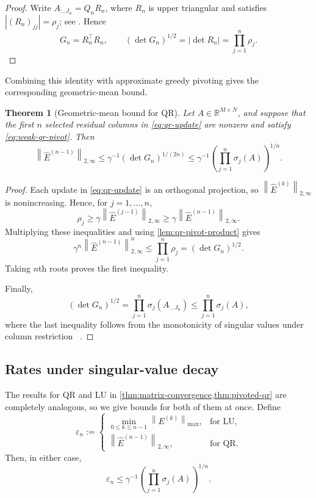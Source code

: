 \documentclass[11pt]{article}
\newtheorem{theorem}{Theorem}[section]
\theoremstyle{definition}
\theoremstyle{remark}
\newcommand{\R}{\mathbb{R}}
\newcommand{\norm}[1]{\left\lVert #1\right\rVert}
\newcommand{\abs}[1]{\left\lvert #1\right\rvert}
\begin{document}
\begin{proof}
Write
$
    A_{:,J_n}=Q_nR_n
$, where
$R_n$ is upper triangular and satisfies
$\abs{(R_n)_{jj}}=\rho_j$; see
\cite[p.~270]{BusingerGolub1965}. Hence
\[
    G_n=R_n^\top R_n,
    \qquad
    (\det G_n)^{1/2}
    =
    \abs{\det R_n}
    =
    \prod_{j=1}^n\rho_j.
\]
\end{proof}

Combining this identity with approximate greedy pivoting gives the
corresponding geometric-mean bound.

\begin{theorem}[Geometric-mean bound for QR]
\label{thm:pivoted-qr}
Let $A\in\R^{M\times N}$, and suppose that the first $n$ selected
residual columns in \eqref{eq:qr-update} are nonzero and satisfy
\eqref{eq:weak-qr-pivot}. Then
\begin{equation*}
    \norm{\widehat E^{(n-1)}}_{2,\infty}
    \le
    \gamma^{-1}(\det G_n)^{1/(2n)}
    \le
    \gamma^{-1}
    \left(\prod_{j=1}^n\sigma_j(A)\right)^{1/n}.
\end{equation*}
\end{theorem}

\begin{proof}
Each update in \eqref{eq:qr-update} is an orthogonal projection, so
$\norm{\widehat E^{(k)}}_{2,\infty}$ is nonincreasing. Hence, for
$j=1,\ldots,n$,
\[
    \rho_j
    \ge
    \gamma\norm{\widehat E^{(j-1)}}_{2,\infty}
    \ge
    \gamma\norm{\widehat E^{(n-1)}}_{2,\infty}.
\]
Multiplying these inequalities and using
\cref{lem:qr-pivot-product} gives
\[
    \gamma^n
    \norm{\widehat E^{(n-1)}}_{2,\infty}^n
    \le
    \prod_{j=1}^n\rho_j
    =
    (\det G_n)^{1/2}.
\]
Taking $n$th roots proves the first inequality.

Finally,
\[
    (\det G_n)^{1/2}
    =
    \prod_{j=1}^n\sigma_j(A_{:,J_n})
    \le
    \prod_{j=1}^n\sigma_j(A),
\]
where the last inequality follows
from the monotonicity of singular
values under column restriction~
\cite[Corollary~7.3.6]{HornJohnson2013}.
\end{proof}


\subsection{Rates under singular-value decay}
\label{subsec:matrix-singular-value-rates}

The results for QR and LU in
\cref{thm:matrix-convergence,thm:pivoted-qr} are completely analogous,
so we give bounds for both of them at once.
Define
\[
    \varepsilon_n
    :=
    \begin{cases}
      \displaystyle
      \min_{0\le k\le n-1}\norm{E^{(k)}}_{\max},
      &\text{for LU},\\[3mm]
      \norm{\widehat E^{(n-1)}}_{2,\infty},
      &\text{for QR}.
    \end{cases}
\]
Then, in either case,
\begin{equation}
    \varepsilon_n
    \le
    \gamma^{-1}
    \left(\prod_{j=1}^n\sigma_j(A)\right)^{1/n}.
    \label{eq:common-geometric-mean-bound}
\end{equation}
\end{document}
